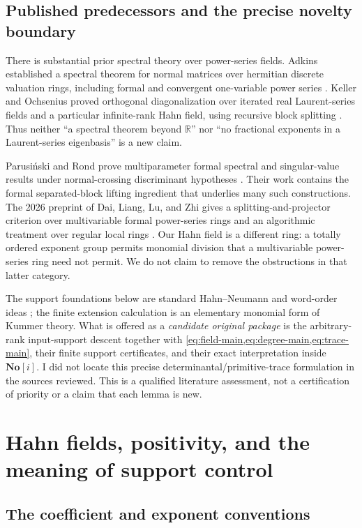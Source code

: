 \documentclass[11pt,letterpaper]{article}
\numberwithin{equation}{section}
\theoremstyle{definition}
\theoremstyle{remark}
\newcommand{\R}{\mathbb R}
\newcommand{\SC}{\mathbf{No}[i]}
\begin{document}
\subsection{Published predecessors and the precise novelty boundary}
\label{sec:prior}

There is substantial prior spectral theory over power-series fields.
Adkins established a spectral theorem for normal matrices over hermitian
discrete valuation rings, including formal and convergent one-variable power
series \cite{Adkins}. Keller and Ochsenius proved orthogonal diagonalization
over iterated real Laurent-series fields and a particular infinite-rank Hahn
field, using recursive block splitting \cite{KO}. Thus neither ``a spectral
theorem beyond $\R$'' nor ``no fractional exponents in a Laurent-series
eigenbasis'' is a new claim.

Parusi\'nski and Rond prove multiparameter formal spectral and singular-value
results under normal-crossing discriminant hypotheses \cite{PR}. Their work
contains the formal separated-block lifting ingredient that underlies many
such constructions. The 2026 preprint of Dai, Liang, Lu, and Zhi gives a
splitting-and-projector criterion over multivariable formal power-series rings
and an algorithmic treatment over regular local rings \cite{DLLZ}. Our Hahn
field is a different ring: a totally ordered exponent group permits monomial
division that a multivariable power-series ring need not permit. We do not
claim to remove the obstructions in that latter category.

The support foundations below are standard Hahn--Neumann and word-order
ideas \cite{Neumann,Higman}; the finite extension calculation is an elementary
monomial form of Kummer theory. What is offered as a \emph{candidate original
package} is the arbitrary-rank input-support descent together with
\cref{eq:field-main,eq:degree-main,eq:trace-main}, their finite support
certificates, and their exact interpretation inside $\SC$. I did not locate
this precise determinantal/primitive-trace formulation in the sources
reviewed. This is a qualified literature assessment, not a certification of
priority or a claim that each lemma is new.

\section{Hahn fields, positivity, and the meaning of support control}
\label{sec:hahn}

\subsection{The coefficient and exponent conventions}
\end{document}
